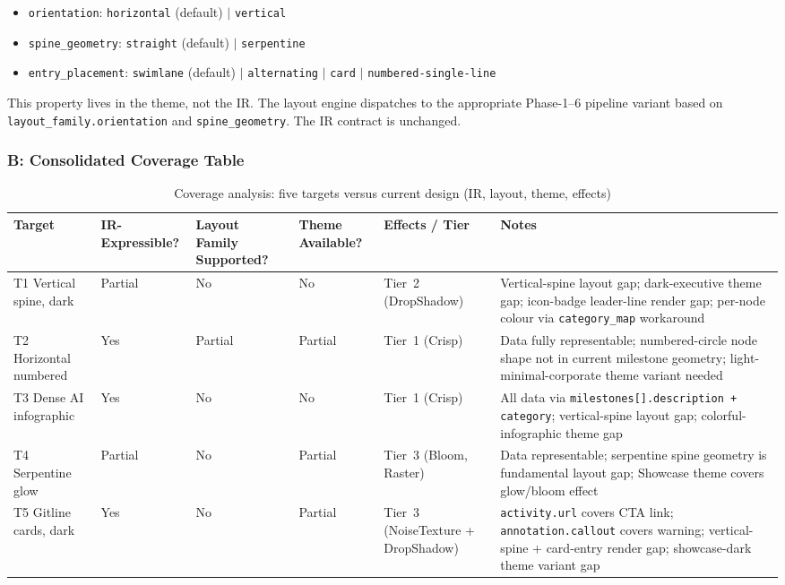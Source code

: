 \begin{itemize}
  \item \texttt{orientation}: \texttt{horizontal} (default) $|$ \texttt{vertical}
  \item \texttt{spine\_geometry}: \texttt{straight} (default) $|$ \texttt{serpentine}
  \item \texttt{entry\_placement}: \texttt{swimlane} (default) $|$ \texttt{alternating}
        $|$ \texttt{card} $|$ \texttt{numbered-single-line}
\end{itemize}

This property lives in the theme, not the IR. The layout engine dispatches to the
appropriate Phase-1--6 pipeline variant based on \texttt{layout\_family.orientation}
and \texttt{spine\_geometry}. The IR contract is unchanged.

\subsubsection{B: Consolidated Coverage Table}
\label{sec:target-coverage-table}

\begin{table}[ht]
\centering
\footnotesize
\begin{tabularx}{\textwidth}{lXXXXX}
\toprule
\textbf{Target} &
\textbf{IR-Expressible?} &
\textbf{Layout Family Supported?} &
\textbf{Theme Available?} &
\textbf{Effects / Tier} &
\textbf{Notes} \\
\midrule
T1 Vertical spine, dark &
Partial &
No &
No &
Tier~2 (DropShadow) &
Vertical-spine layout gap; dark-executive theme gap; icon-badge leader-line render gap;
per-node colour via \texttt{category\_map} workaround \\[4pt]

T2 Horizontal numbered &
Yes &
Partial &
Partial &
Tier~1 (Crisp) &
Data fully representable; numbered-circle node shape not in current milestone geometry;
light-minimal-corporate theme variant needed \\[4pt]

T3 Dense AI infographic &
Yes &
No &
No &
Tier~1 (Crisp) &
All data via \texttt{milestones[].description + category}; vertical-spine layout gap;
colorful-infographic theme gap \\[4pt]

T4 Serpentine glow &
Partial &
No &
Partial &
Tier~3 (Bloom, Raster) &
Data representable; serpentine spine geometry is fundamental layout gap;
Showcase theme covers glow/bloom effect \\[4pt]

T5 Gitline cards, dark &
Yes &
No &
Partial &
Tier~3 (NoiseTexture + DropShadow) &
\texttt{activity.url} covers CTA link; \texttt{annotation.callout} covers warning;
vertical-spine + card-entry render gap; showcase-dark theme variant gap \\
\bottomrule
\end{tabularx}
\caption{Coverage analysis: five targets versus current design (IR, layout, theme, effects)}
\label{tab:target-coverage}
\end{table}


